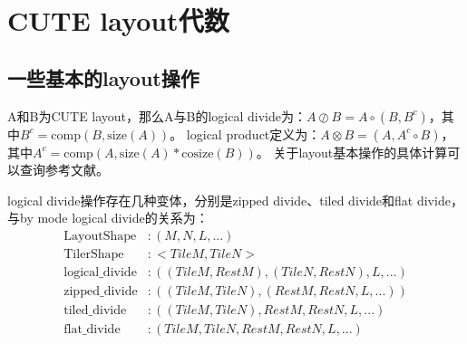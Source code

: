 \documentclass[a4paper,12pt]{ctexart}
\numberwithin{equation}{section}
\begin{document}
\section{CUTE layout代数}
\subsection{一些基本的layout操作}
A和B为CUTE layout，那么A与B的logical divide为：$A \oslash B = A \circ (B,B^c)$，其中$B^c=\mathrm{comp}(B,\mathrm{size}(A))$。
logical product定义为：$A \otimes B = (A,A^c \circ B)$，其中$A^c=\mathrm{comp}(A,\mathrm{size}(A)*\mathrm{cosize}(B))$。
关于layout基本操作的具体计算可以查询参考文献\cite{carlisle2026categoricalfoundationscutelayouts}。

logical divide操作存在几种变体，分别是zipped divide、tiled divide和flat divide，与by mode logical divide的关系为：
\begin{equation}
  \begin{aligned}
    \mathrm{Layout Shape}    & : (M, N, L, ...)                         \\
    \mathrm{Tiler Shape}     & : <TileM, TileN>                         \\
    \mathrm{logical\_divide} & : ((TileM,RestM), (TileN,RestN), L, ...) \\
    \mathrm{zipped\_divide}  & : ((TileM,TileN), (RestM,RestN,L,...))   \\
    \mathrm{tiled\_divide}   & : ((TileM,TileN), RestM, RestN, L, ...)  \\
    \mathrm{flat\_divide}    & : (TileM, TileN, RestM, RestN, L, ...)
  \end{aligned}
\end{equation}
\end{document}
